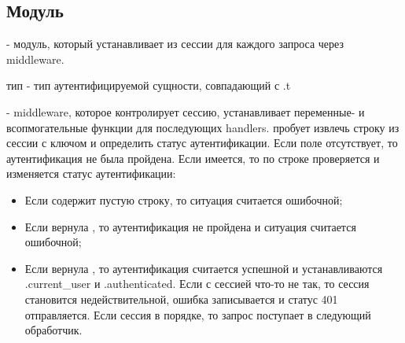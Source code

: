 \subsection{Модуль }\label{page-FPauth-module-FPauth-module-Make+u+Auth-module-Session+u+manager}%
 - модуль, который устанавливает  из сессии для каждого запроса через \hyperref[page-FPauth-core-module-FPauth+u+core-module-Auth+u+sign-module-type-SESSIONMANAGER-val-auth+u+setup]{} middleware.

\label{page-FPauth-module-FPauth-module-Make+u+Auth-module-Session+u+manager-type-entity}\begin{ocamlindent}тип  - тип аутентифицируемой сущности, совпадающий с .t\end{ocamlindent}%
\medbreak
\label{page-FPauth-module-FPauth-module-Make+u+Auth-module-Session+u+manager-val-auth+u+setup}\begin{ocamlindent} - middleware, которое контролирует сессию, устанавливает переменные- и всопмогательные функции для последующих handlers. пробует извлечь строку из сессии с ключом  и определить статус аутентификации. Если поле  отсутствует, то аутентификация не была пройдена. Если  имеется, то по строке проверяется и изменяется статус аутентификации:\begin{itemize}\item{Если  содержит пустую строку, то ситуация считается ошибочной;}%
\item{Если \hyperref[page-FPauth-module-FPauth-module-Make+u+Auth-argument-1-M-val-deserialize]{} вернула , то аутентификация не пройдена и ситуация считается ошибочной;}%
\item{Если \hyperref[page-FPauth-module-FPauth-module-Make+u+Auth-argument-1-M-val-deserialize]{} вернула , то аутентификация считается успешной и устанавливаются .current\_user и .authenticated. Если с сессией что-то не так, то сессия становится недействительной, ошибка записывается и статус 401 отправляется. Если сессия в порядке, то запрос поступает в следующий обработчик.}\end{itemize}%
\end{ocamlindent}%
\medbreak


